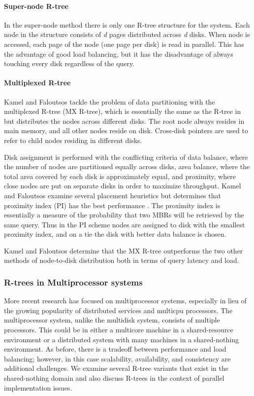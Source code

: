 \paragraph{Super-node R-tree}
In the super-node method \cite{kamel1992parallel,thebook} there is only
one R-tree structure for the system. Each node in the structure consists of
\emph{d} pages distributed across \emph{d} disks. When node is accessed, each
page of the node (one page per disk) is read in parallel. This has the 
advantage of good load balancing, but it has the disadvantage of
always touching every disk regardless of the query.

\paragraph{Multiplexed R-tree}
Kamel and Faloutsos tackle the problem of data partitioning with the 
multiplexed R-tree (MX R-tree)\cite{kamel1992parallel}, which is 
essentially the same as the R-tree in \cite{guttman84} but distributes the 
nodes across different disks. The root node always resides in main memory, 
and all other nodes reside on disk. Cross-disk pointers are used to refer 
to child nodes residing in different disks. 

Disk assignment is performed with the conflicting criteria of
data balance, where the number of nodes are partitioned equally across disks, 
area balance, where the total area covered by each disk is approximately 
equal, and proximity, where close nodes are put on separate disks in order to
maximize throughput. Kamel and Faloutsos examine several placement 
heuristics but determines that proximity index (PI) has the best performance 
\cite{kamel1992parallel}. The proximity index is essentially a measure of the 
probability that two MBRs
will be retrieved by the same query. Thus in the PI scheme nodes are assigned 
to disk with the smallest proximity index, and on a tie the disk with better 
data balance is chosen.

Kamel and Faloutsos determine that the MX R-tree outperforms the two other 
methods of node-to-disk distribution both in terms of query latency and load.
 
\subsubsection{R-trees in Multiprocessor systems}
More recent research has focused on multiprocessor systems, especially in 
lieu of the growing popularity of distributed services and multicpu processors.
The multiprocessor system, unlike the multidisk system, consists of multiple 
processors. This could be in either a multicore machine in a shared-resource
environment or a distributed system with many machines in a shared-nothing 
environment. As before, there is a tradeoff between performance and load 
balancing; however, in this case scalability, availability, and consistency
are additional challenges. We examine several R-tree variants that exist in
the shared-nothing domain and also discuss R-trees in the context of parallel 
implementation issues.

